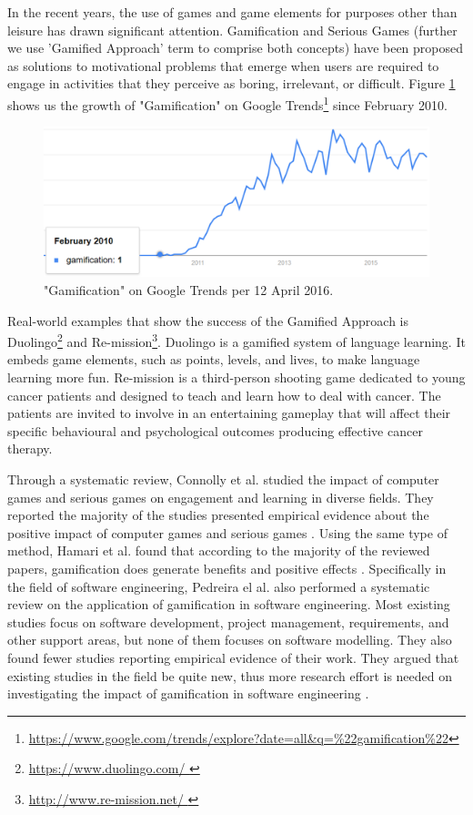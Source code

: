 \documentclass[12pt, a4paper]{report}
\begin{document}
In the recent years, the use of games and game elements for purposes other than leisure has drawn significant attention. Gamification \cite{deterding2011game} and Serious Games \cite{Michael2005} (further we use 'Gamified Approach' term to comprise both concepts) have been proposed as solutions to motivational problems that emerge when users are required to engage in activities that they perceive as boring, irrelevant, or difficult. Figure \ref{gamification-trend} shows us the growth of "Gamification" on Google Trends\footnote{\url{https://www.google.com/trends/explore?date=all&q=\%22gamification\%22}} since February 2010. 

\begin{figure}[ht]
\centering
\includegraphics[width=12cm]{gamification-trend}
\caption{"Gamification" on Google Trends per 12 April 2016.}
\label{gamification-trend}
\end{figure}

Real-world examples that show the success of the Gamified Approach is Duolingo\footnote{\url{https://www.duolingo.com/
}} and Re-mission\footnote{\url{http://www.re-mission.net/
}}. Duolingo is a gamified system of language learning. It embeds game elements, such as points, levels, and lives, to make language learning more fun. Re-mission is a third-person shooting game dedicated to young cancer patients and designed to teach and learn how to deal with cancer. The patients are invited to involve in an entertaining gameplay that will affect their specific behavioural and psychological outcomes producing effective cancer therapy.
 
Through a systematic review, Connolly et al. studied the impact of computer games and serious games on engagement and learning in diverse fields. They reported the majority of the studies presented empirical evidence about the positive impact of computer games and serious games \cite{connolly2012systematic}. Using the same type of method, Hamari et al. found that according to the majority of the reviewed papers, gamification does generate benefits and positive effects \cite{hamari2014does}. Specifically in the field of software engineering, Pedreira el al. also performed a systematic review on the application of gamification in software engineering. Most existing studies focus on software development, project management, requirements, and other support areas, but none of them focuses on software modelling. They also found fewer studies reporting empirical evidence of their work. They argued that existing studies in the field be quite new, thus more research effort is needed on investigating the impact of gamiﬁcation in software engineering \cite{Pedreira2015}. 
\end{document}
